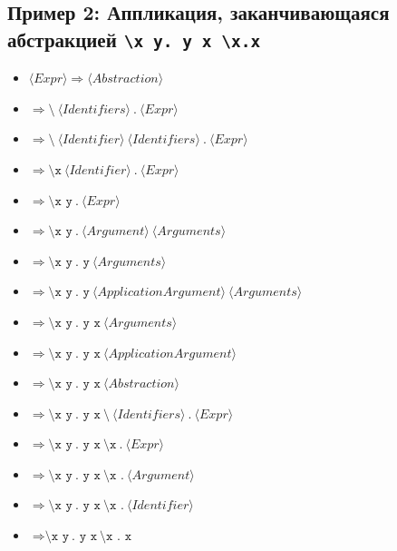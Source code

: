 \documentclass{article}
\begin{document}
\subsection{Пример 2: Аппликация, заканчивающаяся абстракцией \texttt{\textbackslash x y. y x \textbackslash x.x}}
\begin{itemize}
    \item $\langle Expr \rangle \Rightarrow \langle Abstraction \rangle$
    \item $\Rightarrow \texttt{\textbackslash} \ \langle Identifiers \rangle \ \texttt{.} \ \langle Expr \rangle$
    \item $\Rightarrow \texttt{\textbackslash} \ \langle Identifier \rangle \ \langle Identifiers \rangle \ \texttt{.} \ \langle Expr \rangle$
    \item $\Rightarrow \texttt{\textbackslash x} \ \langle Identifier \rangle \ \texttt{.} \ \langle Expr \rangle$
    \item $\Rightarrow \texttt{\textbackslash x y} \ \texttt{.} \ \langle Expr \rangle$
    \item $\Rightarrow \texttt{\textbackslash x y} \ \texttt{.} \ \langle Argument \rangle \ \langle Arguments \rangle$
    \item $\Rightarrow \texttt{\textbackslash x y} \ \texttt{. y} \ \langle Arguments \rangle$
    \item $\Rightarrow \texttt{\textbackslash x y} \ \texttt{. y} \ \langle ApplicationArgument \rangle \ \langle Arguments \rangle$
    \item $\Rightarrow \texttt{\textbackslash x y} \ \texttt{. y x} \ \langle Arguments \rangle$
    \item $\Rightarrow \texttt{\textbackslash x y} \ \texttt{. y x} \ \langle ApplicationArgument \rangle$
    \item $\Rightarrow \texttt{\textbackslash x y} \ \texttt{. y x} \ \langle Abstraction \rangle$
    \item $\Rightarrow \texttt{\textbackslash x y} \ \texttt{. y x} \ \texttt{\textbackslash} \ \langle Identifiers \rangle \ \texttt{.} \ \langle Expr \rangle$
    \item $\Rightarrow \texttt{\textbackslash x y} \ \texttt{. y x} \ \texttt{\textbackslash x} \ \texttt{.} \ \langle Expr \rangle$
    \item $\Rightarrow \texttt{\textbackslash x y} \ \texttt{. y x} \ \texttt{\textbackslash x .} \ \langle Argument \rangle$
    \item $\Rightarrow \texttt{\textbackslash x y} \ \texttt{. y x} \ \texttt{\textbackslash x .} \ \langle Identifier \rangle$
    \item $\Rightarrow \texttt{\textbackslash x y} \ \texttt{. y x} \ \texttt{\textbackslash x . x}$
\end{itemize}
\end{document}
